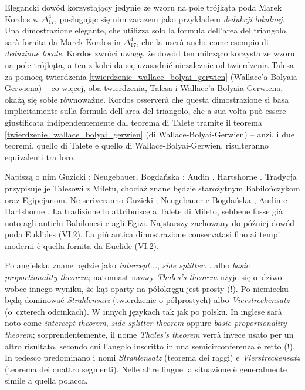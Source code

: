 Elegancki dowód korzystający jedynie ze wzoru na pole trójkąta poda Marek Kordos w $\Delta_{17}^4$, posługując się nim zarazem jako przykładem \emph{dedukcji lokalnej}. %
Una dimostrazione elegante, che utilizza solo la formula dell'area del triangolo, sarà fornita da Marek Kordos in $\Delta_{17}^4$, che la userà anche come esempio di \emph{deduzione locale}. %
Kordos zwróci uwagę, że dowód ten milcząco korzysta ze wzoru na pole trójkąta, a ten z kolei da się uzasadnić niezależnie od twierdzenia Talesa za pomocą twierdzenia \ref{twierdzenie_wallace_bolyai_gerwien} (Wallace'a-Bolyaia-Gerwiena) -- co więcej, oba twierdzenia, Talesa i Wallace'a-Bolyaia-Gerwiena, okażą się sobie równoważne. %
Kordos osserverà che questa dimostrazione si basa implicitamente sulla formula dell'area del triangolo, che a sua volta può essere giustificata indipendentemente dal teorema di Talete tramite il teorema \ref{twierdzenie_wallace_bolyai_gerwien} (di Wallace-Bolyai-Gerwien) -- anzi, i due teoremi, quello di Talete e quello di Wallace-Bolyai-Gerwien, risulteranno equivalenti tra loro. %

Napiszą o nim Guzicki \cite[s. 75]{guzicki_2021}; Neugebauer, Bogdańska \cite[s. 48-56]{neugebauer_2018}; Audin \cite[s. 24, 173]{audin_2003}, Hartshorne \cite[s. 177]{hartshorne_2000}. %
Tradycja przypisuje je Talesowi z Miletu, chociaż znane będzie starożytnym Babilończykom oraz Egipcjanom. %
Ne scriveranno Guzicki \cite[p. 75]{guzicki_2021}; Neugebauer e Bogdańska \cite[p. 48-56]{neugebauer_2018}, Audin \cite[p. 24, 173]{audin_2003} e Hartshorne \cite[p. 177]{hartshorne_2000}. %
La tradizione lo attribuisce a Talete di Mileto, sebbene fosse già noto agli antichi Babilonesi e agli Egizi. %
Najstarszy zachowany do później dowód poda Euklides (VI.2). %
La più antica dimostrazione conservatasi fino ai tempi moderni è quella fornita da Euclide (VI.2). %

Po angielsku znane będzie jako \emph{intercept...}, \emph{side splitter...} albo \emph{basic proportionality theorem}; natomiast nazwy \emph{Thales's theorem} użyje się o~dziwo wobec innego wyniku, że kąt oparty na półokręgu jest prosty (!). %
Po niemiecku będą dominować \emph{Strahlensatz} (twierdzenie o półprostych) albo \emph{Vierstreckensatz} (o~czterech odcinkach). %
W innych językach tak jak po polsku. %
In inglese sarà noto come \emph{intercept theorem}, \emph{side splitter theorem} oppure \emph{basic proportionality theorem}; sorprendentemente, il nome \emph{Thales's theorem} verrà invece usato per un altro risultato, secondo cui l'angolo inscritto in una semicirconferenza è retto (!). %
In tedesco predominano i nomi \emph{Strahlensatz} (teorema dei raggi) e \emph{Vierstreckensatz} (teorema dei quattro segmenti). %
Nelle altre lingue la situazione è generalmente simile a quella polacca. %

